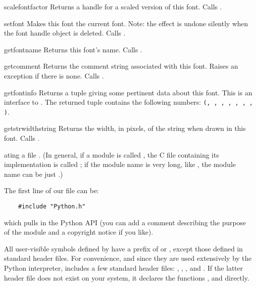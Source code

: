 \renewcommand{\indexsubitem}{(font handle method)}
\begin{funcdesc}{scalefont}{factor}
Returns a handle for a scaled version of this font.
Calls .
\end{funcdesc}

\begin{funcdesc}{setfont}{}
Makes this font the current font.
Note: the effect is undone silently when the font handle object is
deleted.
Calls .
\end{funcdesc}

\begin{funcdesc}{getfontname}{}
Returns this font's name.
Calls .
\end{funcdesc}

\begin{funcdesc}{getcomment}{}
Returns the comment string associated with this font.
Raises an exception if there is none.
Calls .
\end{funcdesc}

\begin{funcdesc}{getfontinfo}{}
Returns a tuple giving some pertinent data about this font.
This is an interface to .
The returned tuple contains the following numbers:
{\tt(, , , ,
, , , )}.
\end{funcdesc}

\begin{funcdesc}{getstrwidth}{string}
Returns the width, in pixels, of the string when drawn in this font.
Calls .
\end{funcdesc}
ating a file .  (In general, if a
module is called , the C file containing its implementation
is called ; if the module name is very long, like
, the module name can be just .)

The first line of our file can be:

\begin{verbatim}
    #include "Python.h"
\end{verbatim}

which pulls in the Python API (you can add a comment describing the
purpose of the module and a copyright notice if you like).

All user-visible symbols defined by  have a prefix of
 or , except those defined in standard header files.
For convenience, and since they are used extensively by the Python
interpreter,  includes a few standard header files:
, , , and
.  If the latter header file does not exist on your
system, it declares the functions ,  and
 directly.

